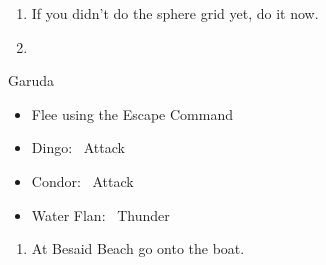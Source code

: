 \begin{enumerate}[resume]
  \item If you didn't do the sphere grid yet, do it now.
  \item \formation{\tidus}{\yuna}{\lulu}
\end{enumerate}
\begin{battle}{Garuda}
  \begin{itemize}
    \item Flee using the Escape Command
  \end{itemize}
\end{battle}
\begin{encounters}
  \begin{itemize}
    \item Dingo: \tidus\ Attack
    \item Condor: \wakka\ Attack
    \item Water Flan: \lulu\ Thunder
  \end{itemize}
\end{encounters}
\begin{enumerate}[resume]
  \item At Besaid Beach go onto the boat.
\end{enumerate}